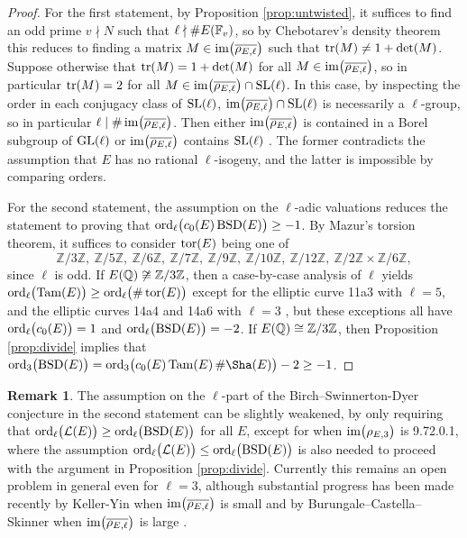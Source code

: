 \documentclass{article}
\theoremstyle{plain}
\theoremstyle{definition}
\newtheorem{remark}[n]{Remark}
\newcommand{\BSD}{\operatorname{BSD}}
\newcommand{\FF}{\mathbb{F}}
\newcommand{\GL}{\operatorname{GL}}
\newcommand{\im}{\operatorname{im}}
\newcommand{\LLL}{\mathcal{L}}
\newcommand{\ord}{\operatorname{ord}}
\newcommand{\QQ}{\mathbb{Q}}
\newcommand{\SL}{\operatorname{SL}}
\newcommand{\Tam}{\operatorname{Tam}}
\newcommand{\tor}{\operatorname{tor}}
\newcommand{\tr}{\operatorname{tr}}
\newcommand{\ZZ}{\mathbb{Z}}
\newcommand{\br}{\!\del}
\begin{document}
\begin{proof}
For the first statement, by Proposition \ref{prop:untwisted}, it suffices to find an odd prime $ v \nmid N $ such that $ \ell \nmid \#E\br{\FF_v} $, so by Chebotarev's density theorem this reduces to finding a matrix $ M \in \im\br{\overline{\rho_{E, \ell}}} $ such that $ \tr\br{M} \ne 1 + \det\br{M} $. Suppose otherwise that $ \tr\br{M} = 1 + \det\br{M} $ for all $ M \in \im\br{\overline{\rho_{E, \ell}}} $, so in particular $ \tr\br{M} = 2 $ for all $ M \in \im\br{\overline{\rho_{E, \ell}}} \cap \SL\br{\ell} $. In this case, by inspecting the order in each conjugacy class of $ \SL\br{\ell} $, $ \im\br{\overline{\rho_{E, \ell}}} \cap \SL\br{\ell} $ is necessarily a $ \ell $-group, so in particular $ \ell \mid \#\im\br{\overline{\rho_{E, \ell}}} $. Then either $ \im\br{\overline{\rho_{E, \ell}}} $ is contained in a Borel subgroup of $ \GL\br{\ell} $ or $ \im\br{\overline{\rho_{E, \ell}}} $ contains $ \SL\br{\ell} $ \cite[Proposition 15]{Ser72}. The former contradicts the assumption that $ E $ has no rational $ \ell $-isogeny, and the latter is impossible by comparing orders.

For the second statement, the assumption on the $ \ell $-adic valuations reduces the statement to proving that $ \ord_\ell\br{c_0\br{E}\BSD\br{E}} \ge -1 $. By Mazur's torsion theorem, it suffices to consider $ \tor\br{E} $ being one of
$$ \ZZ / 3\ZZ, \ \ZZ / 5\ZZ, \ \ZZ / 6\ZZ, \ \ZZ / 7\ZZ, \ \ZZ / 9\ZZ, \ \ZZ / 10\ZZ, \ \ZZ / 12\ZZ, \ \ZZ / 2\ZZ \times \ZZ / 6\ZZ, $$
since $ \ell $ is odd. If $ E\br{\QQ} \not\cong \ZZ / 3\ZZ $, then a case-by-case analysis of $ \ell $ yields $ \ord_\ell\br{\Tam\br{E}} \ge \ord_\ell\br{\#\tor\br{E}} $ except for the elliptic curve 11a3 with $ \ell = 5 $, and the elliptic curves 14a4 and 14a6 with $ \ell = 3 $ \cite[Proposition 1.1]{Lor11}, but these exceptions all have $ \ord_\ell\br{c_0\br{E}} = 1 $ and $ \ord_\ell\br{\BSD\br{E}} = -2 $. If $ E\br{\QQ} \cong \ZZ / 3\ZZ $, then Proposition \ref{prop:divide} implies that $ \ord_3\br{\BSD\br{E}} = \ord_3\br{c_0\br{E}\Tam\br{E}\#\Sha\br{E}} - 2 \ge -1 $.
\end{proof}

\begin{remark}
The assumption on the $ \ell $-part of the Birch--Swinnerton-Dyer conjecture in the second statement can be slightly weakened, by only requiring that $ \ord_\ell\br{\LLL\br{E}} \ge \ord_\ell\br{\BSD\br{E}} $ for all $ E $, except for when $ \im\br{\rho_{E, 3}} $ is 9.72.0.1, where the assumption $ \ord_\ell\br{\LLL\br{E}} \le \ord_\ell\br{\BSD\br{E}} $ is also needed to proceed with the argument in Proposition \ref{prop:divide}. Currently this remains an open problem in general even for $ \ell = 3 $, although substantial progress has been made recently by Keller-Yin when $ \im\br{\overline{\rho_{E, \ell}}} $ is small \cite[Theorem C]{KY24} and by Burungale--Castella--Skinner when $ \im\br{\overline{\rho_{E, \ell}}} $ is large \cite[Corollary 1.3.1]{BCS24}.
\end{remark}
\end{document}
